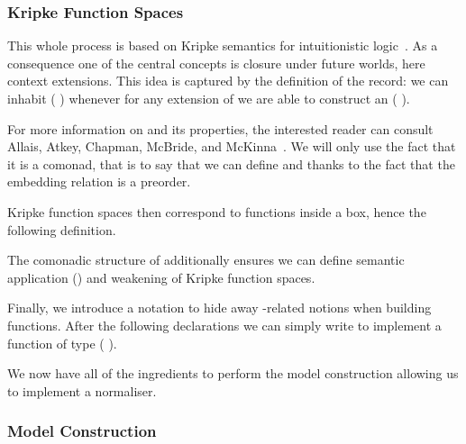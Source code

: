 \documentclass{article}
\begin{document}
\subsubsection{Kripke Function Spaces}

This whole process is based on Kripke semantics for intuitionistic
logic~\cite{DBLP:journals/apal/MitchellM91}.
As a consequence one of the central concepts is closure under future
worlds, here context extensions.
This idea is captured by the definition of the  record: we
can inhabit (  ) whenever for any extension
 of  we are able to construct an ( ).


For more information on  and its properties, the interested
reader can consult Allais, Atkey, Chapman, McBride, and
McKinna~\cite[Section~3.1]{DBLP:journals/jfp/AllaisACMM21}.
%
We will only use the fact that it is a comonad, that is to say that
we can define  and  thanks to
the fact that the embedding relation is a preorder.


Kripke function spaces then correspond to functions inside a box,
hence the following definition.


The comonadic structure of  additionally ensures we can define
semantic application (\AF{\_\$\$\_}) and weakening of Kripke function
spaces.

\noindent
\begin{minipage}{0.45\textwidth}
\end{minipage}\hfill
\begin{minipage}{0.5\textwidth}
\end{minipage}

Finally, we introduce a notation to hide away -related
notions when building  functions.
%
After the following declarations we can simply write
 to implement a function of type
(   ).


We now have all of the ingredients to perform the model
construction allowing us to implement a normaliser.

\subsubsection{Model Construction}
\end{document}
